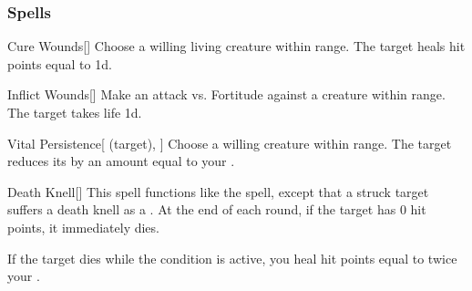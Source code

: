\subsubsection{Spells}


\lowercase{\hypertarget{spell:Cure Wounds}{}}\label{spell:Cure Wounds}
\begin{freeability}[\nth{1}]{\hypertarget{spell:Cure Wounds}{Cure Wounds}}[]
Choose a willing living creature within \rngmed range.
The target heals hit points equal to  \plus1d.
\end{freeability}
\vspace{0.25em}



\lowercase{\hypertarget{spell:Inflict Wounds}{}}\label{spell:Inflict Wounds}
\begin{freeability}[\nth{1}]{\hypertarget{spell:Inflict Wounds}{Inflict Wounds}}[]
Make an attack vs. Fortitude against a creature within \rngmed range.
\hit The target takes life  \plus1d.
\end{freeability}
\vspace{0.25em}



\lowercase{\hypertarget{spell:Vital Persistence}{}}\label{spell:Vital Persistence}
\begin{attuneability}[\nth{2}]{\hypertarget{spell:Vital Persistence}{Vital Persistence}}[ (target), ]
Choose a willing creature within \rngclose range.
The target reduces its  by an amount equal to your .
\end{attuneability}
\vspace{0.25em}



\lowercase{\hypertarget{spell:Death Knell}{}}\label{spell:Death Knell}
\begin{freeability}[\nth{3}]{\hypertarget{spell:Death Knell}{Death Knell}}[]
This spell functions like the  spell, except that a struck target suffers a death knell as a .
At the end of each round, if the target has 0 hit points, it immediately dies.

If the target dies while the condition is active, you heal hit points equal to twice your .
\end{freeability}
\vspace{0.25em}



